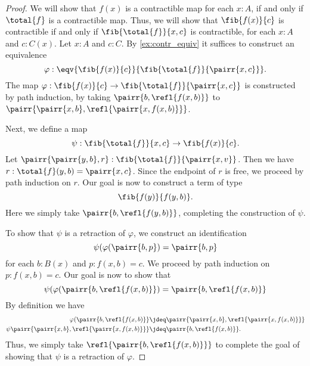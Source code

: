\begin{proof}
We will show that $f(x)$ is a contractible map for each $x:A$, if and only if $\total{f}$ is a contractible map. Thus, we will show that $\fib{f(x)}{c}$ is contractible if and only if $\fib{\total{f}}{x,c}$ is contractible, for each $x:A$ and $c:C(x)$. Let $x:A$ and $c:C$. By \autoref{ex:contr_equiv} it suffices to construct an equivalence
\begin{equation*}
\varphi:\eqv{\fib{f(x)}{c}}{\fib{\total{f}}{\pairr{x,c}}}.
\end{equation*}
The map $\varphi:{\fib{f(x)}{c}}\to{\fib{\total{f}}{\pairr{x,c}}}$ is constructed by path induction, by taking $\pairr{b,\refl{f(x,b)}}$ to $\pairr{\pairr{x,b},\refl{\pairr{x,f(x,b)}}}$.

Next, we define a map
\begin{equation*}
\psi:{\fib{\total{f}}{x,c}}\to{\fib{f(x)}{c}}.
\end{equation*}
Let $\pairr{\pairr{y,b},r}:\fib{\total{f}}{\pairr{x,v}}$. Then we have $r:\total{f}(y,b)=\pairr{x,c}$. Since the endpoint of $r$ is free, we proceed by path induction on $r$. Our goal is now to construct a term of type
\begin{equation*}
\fib{f(y)}{f(y,b)}. 
\end{equation*}
Here we simply take $\pairr{b,\refl{f(y,b)}}$, completing the construction of $\psi$.

To show that $\psi$ is a retraction of $\varphi$, we construct an identification 
\begin{equation*}
\psi(\varphi(\pairr{b,p})=\pairr{b,p}
\end{equation*}
for each $b:B(x)$ and $p:f(x,b)=c$. We proceed by path induction on $p:f(x,b)=c$. Our goal is now to show that
\begin{equation*}
\psi(\varphi(\pairr{b,\refl{f(x,b)}})=\pairr{b,\refl{f(x,b)}}
\end{equation*}
By definition we have
\begin{align*}
\varphi(\pairr{b,\refl{f(x,b)}} & \jdeq \pairr{\pairr{x,b},\refl{\pairr{x,f(x,b)}}} \\
\psi\pairr{\pairr{x,b},\refl{\pairr{x,f(x,b)}}} & \jdeq\pairr{b,\refl{f(x,b)}}.
\end{align*}
Thus, we simply take $\refl{\pairr{b,\refl{f(x,b)}}}$ to complete the goal of showing that $\psi$ is a retraction of $\varphi$.


\end{proof}

